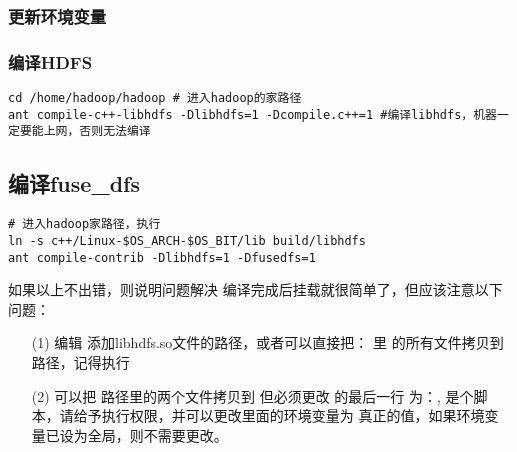 \documentclass{article}
\begin{document}
\subsubsection{更新环境变量}

\subsubsection{编译HDFS}
\begin{verbatim}
cd /home/hadoop/hadoop # 进入hadoop的家路径
ant compile-c++-libhdfs -Dlibhdfs=1 -Dcompile.c++=1 #编译libhdfs，机器一定要能上网，否则无法编译
\end{verbatim}

\subsection{编译fuse\_dfs}
\begin{verbatim}
# 进入hadoop家路径，执行
ln -s c++/Linux-$OS_ARCH-$OS_BIT/lib build/libhdfs 
ant compile-contrib -Dlibhdfs=1 -Dfusedfs=1 
\end{verbatim}

\textsf{如果以上不出错，则说明问题解决}
编译完成后挂载就很简单了，但应该注意以下问题：
\begin{itemize}
\item[(1)] 编辑 添加libhdfs.so文件的路径，或者可以直接把： 里
的所有文件拷贝到路径，记得执行
\item[(2)] 可以把 路径里的两个文件拷贝到 但必须更改
的最后一行 为：,  是个脚本，请给予执行权限，并可以更改里面的环境变量为
真正的值，如果环境变量已设为全局，则不需要更改。
\end{itemize}
\end{document}
